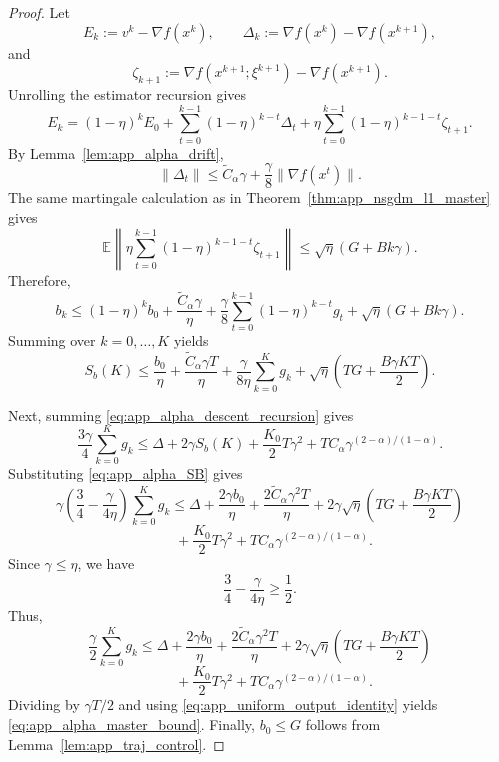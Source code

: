 \documentclass[letter,11pt]{article}
\newcommand{\E}{\mathbb{E}}
\begin{document}
\begin{proof}
Let
\[
    E_k:=v^k-\nabla f(x^k),
    \qquad
    \Delta_k:=\nabla f(x^k)-\nabla f(x^{k+1}),
\]
and
\[
    \zeta_{k+1}
    :=
    \nabla f(x^{k+1};\xi^{k+1})-\nabla f(x^{k+1}).
\]
Unrolling the estimator recursion gives
\[
    E_k
    =
    (1-\eta)^kE_0
    +\sum_{t=0}^{k-1}(1-\eta)^{k-t}\Delta_t
    +\eta\sum_{t=0}^{k-1}(1-\eta)^{k-1-t}\zeta_{t+1}.
\]
By Lemma~\ref{lem:app_alpha_drift},
\[
    \|\Delta_t\|
    \le
    \widetilde C_\alpha\gamma
    +\frac{\gamma}{8}\|\nabla f(x^t)\|.
\]
The same martingale calculation as in Theorem~\ref{thm:app_nsgdm_l1_master}
gives
\[
    \E\left\|
    \eta\sum_{t=0}^{k-1}(1-\eta)^{k-1-t}\zeta_{t+1}
    \right\|
    \le
    \sqrt\eta(G+Bk\gamma).
\]
Therefore,
\begin{equation}
\label{eq:app_alpha_Bk}
    b_k
    \le
    (1-\eta)^kb_0
    +\frac{\widetilde C_\alpha\gamma}{\eta}
    +\frac{\gamma}{8}
    \sum_{t=0}^{k-1}(1-\eta)^{k-t}g_t
    +\sqrt\eta(G+Bk\gamma).
\end{equation}
Summing over \(k=0,\ldots,K\) yields
\begin{equation}
\label{eq:app_alpha_SB}
    S_b(K)
    \le
    \frac{b_0}{\eta}
    +\frac{\widetilde C_\alpha\gamma T}{\eta}
    +\frac{\gamma}{8\eta}\sum_{k=0}^K g_k
    +\sqrt\eta
    \left(TG+\frac{B\gamma KT}{2}\right).
\end{equation}

Next, summing \eqref{eq:app_alpha_descent_recursion} gives
\[
    \frac{3\gamma}{4}\sum_{k=0}^K g_k
    \le
    \Delta
    +2\gamma S_b(K)
    +\frac{K_0}{2}T\gamma^2
    +TC_\alpha\gamma^{(2-\alpha)/(1-\alpha)}.
\]
Substituting \eqref{eq:app_alpha_SB} gives
\[
    \gamma\left(\frac34-\frac{\gamma}{4\eta}\right)
    \sum_{k=0}^K g_k
    \le
    \Delta
    +\frac{2\gamma b_0}{\eta}
    +\frac{2\widetilde C_\alpha\gamma^2T}{\eta}
    +2\gamma\sqrt\eta
    \left(TG+\frac{B\gamma KT}{2}\right)
\]
\[
    \qquad
    +\frac{K_0}{2}T\gamma^2
    +TC_\alpha\gamma^{(2-\alpha)/(1-\alpha)}.
\]
Since \(\gamma\le\eta\), we have
\[
    \frac34-\frac{\gamma}{4\eta}\ge\frac12.
\]
Thus,
\[
    \frac{\gamma}{2}\sum_{k=0}^K g_k
    \le
    \Delta
    +\frac{2\gamma b_0}{\eta}
    +\frac{2\widetilde C_\alpha\gamma^2T}{\eta}
    +2\gamma\sqrt\eta
    \left(TG+\frac{B\gamma KT}{2}\right)
\]
\[
    \qquad
    +\frac{K_0}{2}T\gamma^2
    +TC_\alpha\gamma^{(2-\alpha)/(1-\alpha)}.
\]
Dividing by \(\gamma T/2\) and using
\eqref{eq:app_uniform_output_identity} yields
\eqref{eq:app_alpha_master_bound}. Finally, \(b_0\le G\) follows from
Lemma~\ref{lem:app_traj_control}.
\end{proof}
\end{document}
